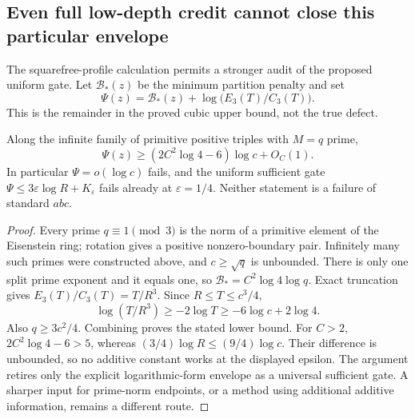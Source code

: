 \subsection{Even full low-depth credit cannot close this particular envelope}
\label{sec:ep-envelope-limit}
The squarefree-profile calculation permits a stronger audit of the proposed
uniform gate. Let $\mathcal B_*(z)$ be the minimum partition penalty and set
\[
 \Psi(z)=\mathcal B_*(z)+\log\bigl(E_3(T)/C_3(T)\bigr).
\]
This is the remainder in the proved cubic upper bound, not the true defect.

\begin{proposition}
\label{prop:ep-envelope-no-go}
Along the infinite family of primitive positive triples with $M=q$ prime,
\[
 \Psi(z)\ge (2C^2\log4-6)\log c+O_C(1).
\]
In particular $\Psi=o(\log c)$ fails, and the uniform sufficient gate
$\Psi\le3\varepsilon\log R+K_\varepsilon$ fails already at
$\varepsilon=1/4$. Neither statement is a failure of standard $abc$.
\end{proposition}
\begin{proof}
Every prime $q\equiv1\pmod3$ is the norm of a primitive element of the
Eisenstein ring; rotation gives a positive nonzero-boundary pair. Infinitely
many such primes were constructed above, and $c\ge\sqrt q$ is unbounded.
There is only one split prime exponent and it equals one, so
$\mathcal B_*=C^2\log4\log q$. Exact truncation gives
$E_3(T)/C_3(T)=T/R^3$. Since $R\le T\le c^3/4$,
\[
 \log(T/R^3)\ge-2\log T\ge-6\log c+2\log4.
\]
Also $q\ge3c^2/4$. Combining proves the stated lower bound. For $C>2$,
$2C^2\log4-6>5$, whereas $(3/4)\log R\le(9/4)\log c$.
Their difference is unbounded, so no additive constant works at the displayed
epsilon. The argument retires only the explicit logarithmic-form envelope
as a universal sufficient gate. A sharper input for prime-norm endpoints,
or a method using additional additive information, remains a different route.
\end{proof}
